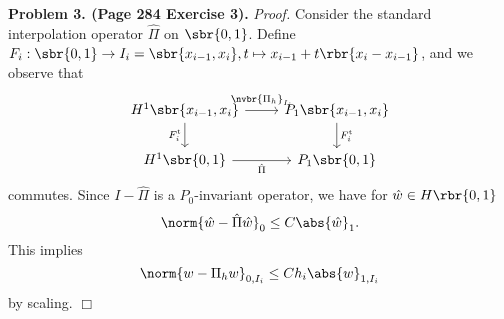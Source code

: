 \documentclass[english, nochinese]{pnote}
\begin{document}
\textbf{Problem 3. (Page 284 Exercise 3).} \textit{Proof.} Consider the standard interpolation operator $\hat{\Pi}$ on $ \sbr{ 0, 1 } $. Define $ F_i : \sbr{ 0, 1 } \rightarrow I_i = \sbr{ x_{ i - 1 }, x_i }, t \mapsto x_{ i - 1 } + t \rbr{ x_i - x_{ i - 1 } } $, and we observe that
\begin{equation}
\begin{tikzcd}
H^1 \sbr{ x_{ i - 1 }, x_i } \arrow[r, "\nvbr{\Pi_h}_{I_i}"] \arrow[d, "F_i^{\text{t}}"'] & P_1 \sbr{ x_{ i - 1 }, x_i } \arrow[d, "F_i^{\text{t}}"] \\
H^1 \sbr{ 0, 1 } \arrow[r, "\hat{\Pi}"'] & P_1 \sbr{ 0, 1 }
\end{tikzcd}
\end{equation}
commutes. Since $ I - \hat{\Pi} $ is a $P_0$-invariant operator, we have for $ \hat{w} \in H \rbr{ 0, 1 } $
\begin{equation}
\norm{ \hat{w} - \hat{\Pi} \hat{w} }_0 \le C \abs{\hat{w}}_1.
\end{equation}
This implies
\begin{equation}
\norm{ w - \Pi_h w }_{ 0, I_i } \le C h_i \abs{w}_{ 1, I_i }
\end{equation}
by scaling.
\hfill$\Box$
\end{document}
